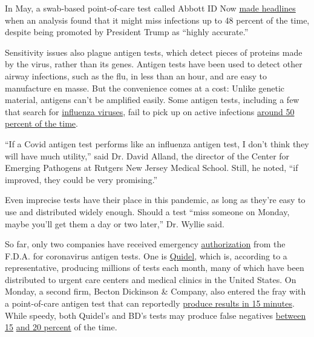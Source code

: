 In May, a swab-based point-of-care test called Abbott ID Now
\href{https://www.nytimes3xbfgragh.onion/interactive/2020/05/12/us/coronavirus-testing-white-house.html}{made
headlines} when an analysis found that it might miss infections up to 48
percent of the time, despite being promoted by President Trump as
``highly accurate.''

Sensitivity issues also plague antigen tests, which detect pieces of
proteins made by the virus, rather than its genes. Antigen tests have
been used to detect other airway infections, such as the flu, in less
than an hour, and are easy to manufacture en masse. But the convenience
comes at a cost: Unlike genetic material, antigens can't be amplified
easily. Some antigen tests, including a few that search for
\href{https://www.cdc.gov/flu/professionals/diagnosis/clinician_guidance_ridt.htm}{influenza
viruses}, fail to pick up on active infections
\href{https://www.cdc.gov/flu/professionals/diagnosis/clinician_guidance_ridt.htm}{around
50 percent of the time}.

``If a Covid antigen test performs like an influenza antigen test, I
don't think they will have much utility,'' said Dr. David Alland, the
director of the Center for Emerging Pathogens at Rutgers New Jersey
Medical School. Still, he noted, ``if improved, they could be very
promising.''

Even imprecise tests have their place in this pandemic, as long as
they're easy to use and distributed widely enough. Should a test ``miss
someone on Monday, maybe you'll get them a day or two later,'' Dr.
Wyllie said.

So far, only two companies have received emergency
\href{https://www.fda.gov/news-events/press-announcements/coronavirus-covid-19-update-fda-authorizes-first-antigen-test-help-rapid-detection-virus-causes}{authorization}
from the F.D.A. for coronavirus antigen tests. One is
\href{https://www.nytimes3xbfgragh.onion/2020/05/09/health/antigen-testing-fda-coronavirus.html}{Quidel},
which is, according to a representative, producing millions of tests
each month, many of which have been distributed to urgent care centers
and medical clinics in the United States. On Monday, a second firm,
Becton Dickinson \& Company, also entered the fray with a point-of-care
antigen test that can reportedly
\href{https://www.nytimes3xbfgragh.onion/reuters/2020/07/06/us/06reuters-health-coronavirus-becton-dickinson.html}{produce
results in 15 minutes}. While speedy, both Quidel's and BD's tests may
produce false negatives
\href{https://investors.bd.com/news-releases/news-release-details/bd-launches-portable-rapid-point-care-antigen-test-detect-sars}{between
15}
\href{https://www.sciencemag.org/news/2020/05/coronavirus-antigen-tests-quick-and-cheap-too-often-wrong}{and
20 percent} of the time.

